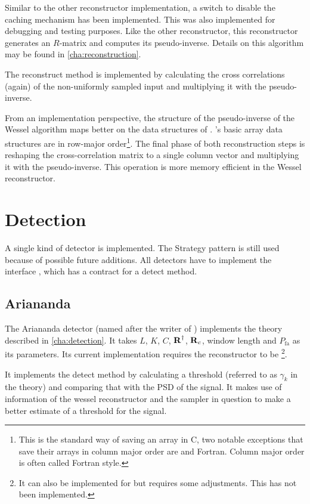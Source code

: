 \documentclass[a4paper, openany, oneside]{memoir}
\begin{document}
Similar to the other reconstructor implementation, a switch to disable the caching mechanism has been implemented. This was also implemented for debugging and testing purposes. Like the other reconstructor, this reconstructor generates an $R$-matrix and computes its pseudo-inverse. Details on this algorithm may be found in \cref{cha:reconstruction}.

The reconstruct method is implemented by calculating the cross correlations (again) of the non-uniformly sampled input and multiplying it with the pseudo-inverse.

From an implementation perspective, the structure of the pseudo-inverse of the Wessel algorithm maps better on the data structures of . 's basic array data structures are in row-major order\footnote{This is the standard way of saving an array in C, two notable exceptions that save their arrays in column major order are \matlab{} and Fortran. Column major order is often called Fortran style.}. The final phase of both reconstruction steps is reshaping the cross-correlation matrix to a single column vector and multiplying it with the pseudo-inverse. This operation is more memory efficient in the Wessel reconstructor.

\section{Detection}
\label{sec:detection}
A single kind of detector is implemented. The Strategy pattern is still used because of possible future additions. All detectors have to implement the interface , which has a contract for a detect method.

\subsection{Ariananda}
\label{sub:ariananda}
The Ariananda detector (named after the writer of \cite{ariananda2012compressive}) implements the theory described in \cref{cha:detection}. It takes $L$, $K$, $C$, $\boldsymbol{\mathbf{R}}^\dagger$, $\boldsymbol{\mathbf{R}}_c$, window length and $P_{\text{fa}}$ as its parameters. Its current implementation requires the reconstructor to be \footnote{It can also be implemented for  but requires some adjustments. This has not been implemented.}.

It implements the detect method by calculating a threshold (referred to as $\gamma_k$ in the theory) and comparing that with the PSD of the signal. It makes use of information of the wessel reconstructor and the sampler in question to make a better estimate of a threshold for the signal.
\end{document}

